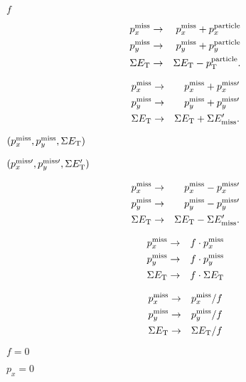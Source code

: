 \documentclass{article}
\begin{document}
$ f $
\pagebreak

\begin{eqnarray*} p_{x}^{\rm miss} & \to & p_{x}^{\rm miss} + p_{x}^{\rm particle} \\ p_{y}^{\rm miss} & \to & p_{y}^{\rm miss} + p_{y}^{\rm particle} \\ \Sigma E_{\rm T} & \to & \Sigma E_{\rm T} - p_{\rm T}^{\rm particle} . \end{eqnarray*}
\pagebreak

\begin{eqnarray*} p_{x}^{\rm miss} & \to & p_{x}^{\rm miss} + p_{x}^{{\rm miss}\prime} \\ p_{y}^{\rm miss} & \to & p_{y}^{\rm miss} + p_{y}^{{\rm miss}\prime} \\ \Sigma E_{\rm T} & \to & \Sigma E_{\rm T} + \Sigma E_{\rm miss}^{\prime} . \end{eqnarray*}
\pagebreak

$ (p_{x}^{\rm miss},p_{y}^{\rm miss},\Sigma E_{\rm T}) $
\pagebreak

$ (p_{x}^{{\rm miss}\prime},p_{y}^{{\rm miss}\prime},\Sigma E_{\rm T}^{\prime}) $
\pagebreak

\begin{eqnarray*} p_{x}^{\rm miss} & \to & p_{x}^{\rm miss} - p_{x}^{{\rm miss}\prime} \\ p_{y}^{\rm miss} & \to & p_{y}^{\rm miss} - p_{y}^{{\rm miss}\prime} \\ \Sigma E_{\rm T} & \to & \Sigma E_{\rm T} - \Sigma E_{\rm miss}^{\prime} . \end{eqnarray*}
\pagebreak

\begin{eqnarray*} p_{x}^{\rm miss} & \to & f \cdot p_{x}^{\rm miss} \\ p_{y}^{\rm miss} & \to & f \cdot p_{y}^{\rm miss} \\ \Sigma E_{\rm T} & \to & f \cdot \Sigma E_{\rm T} \end{eqnarray*}
\pagebreak

\begin{eqnarray*} p_{x}^{\rm miss} & \to & p_{x}^{\rm miss} / f \\ p_{y}^{\rm miss} & \to & p_{y}^{\rm miss} / f \\ \Sigma E_{\rm T} & \to & \Sigma E_{\rm T} / f \end{eqnarray*}
\pagebreak

$ f = 0 $
\pagebreak

$ p_{x} = 0 $
\pagebreak
\end{document}
